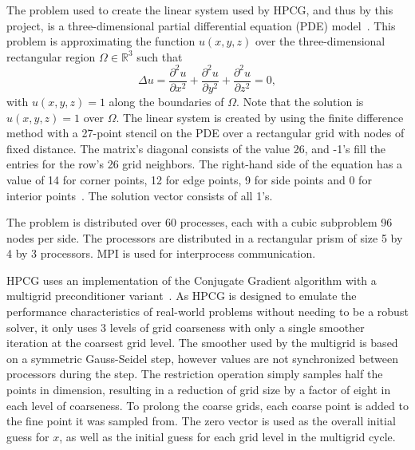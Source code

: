 The problem used to create the linear system used by HPCG, and thus by this project, is a three-dimensional partial differential equation (PDE) model~\cite{Dongarra:2015:HPCG}.
This problem is approximating the function \(u(x, y, z)\) over the three-dimensional rectangular region \(\Omega\in\mathbb{R}^3\) such that
\[
	\Delta u = \frac{\partial^2 u}{\partial x^2} + \frac{\partial^2 u}{\partial y^2} + \frac{\partial^2 u}{\partial z^2} = 0,
\] with \(u(x, y, z) = 1\) along the boundaries of \(\Omega\).
Note that the solution is \(u(x, y, z) = 1\) over \(\Omega\).
The linear system is created by using the finite difference method with a 27-point stencil on the PDE over a rectangular grid with nodes of fixed distance.
The matrix's diagonal consists of the value 26, and -1's fill the entries for the row's 26 grid neighbors.
The right-hand side of the equation has a value of 14 for corner points, 12 for edge points, 9 for side points and 0 for interior points~\cite{Kincaid:2009:Numerical}.
The solution vector consists of all 1's.

The problem is distributed over 60 processes, each with a cubic subproblem 96 nodes per side.
The processors are distributed in a rectangular prism of size 5 by 4 by 3 processors.
MPI is used for interprocess communication.

HPCG uses an implementation of the Conjugate Gradient algorithm with a multigrid preconditioner variant~\cite{Dongarra:2015:HPCG}.
As HPCG is designed to emulate the performance characteristics of real-world problems without needing to be a robust solver, it only uses 3 levels of grid coarseness with only a single smoother iteration at the coarsest grid level.
The smoother used by the multigrid is based on a symmetric Gauss-Seidel step, however values are not synchronized between processors during the step.
The restriction operation simply samples half the points in dimension, resulting in a reduction of grid size by a factor of eight in each level of coarseness.
To prolong the coarse grids, each coarse point is added to the fine point it was sampled from.
The zero vector is used as the overall initial guess for \(x\), as well as the initial guess for each grid level in the multigrid cycle.

